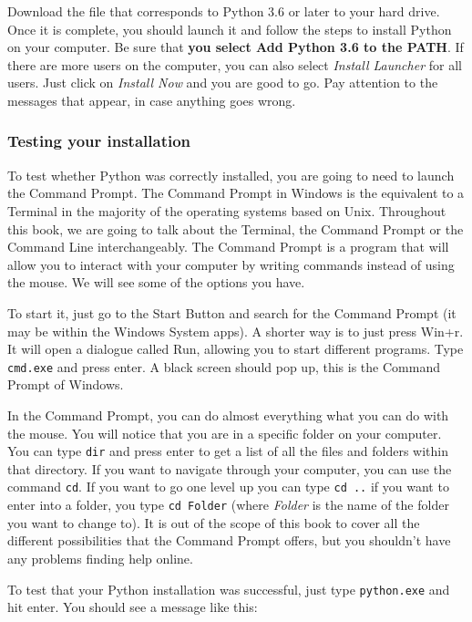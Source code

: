 Download the file that corresponds to Python 3.6 or later to your hard drive. Once it is complete, you should launch it and follow the steps to install Python on your computer. Be sure that \textbf{you select Add Python 3.6 to the PATH}. If there are more users on the computer, you can also select \emph{Install Launcher} for all users. Just click on \textit{Install Now} and you are good to go. Pay attention to the messages that appear, in case anything goes wrong.

\subsubsection{Testing your installation}
To test whether Python was correctly installed, you are going to need to launch the Command Prompt. The Command Prompt in Windows is the equivalent to a Terminal in the majority of the operating systems based on Unix. Throughout this book, we are going to talk about the Terminal, the Command Prompt or the Command Line interchangeably. The Command Prompt is a program that will allow you to interact with your computer by writing commands instead of using the mouse. We will see some of the options you have.

To start it, just go to the Start Button and search for the Command Prompt (it may be within the Windows System apps). A shorter way is to just press Win+r. It will open a dialogue called Run, allowing you to start different programs. Type \texttt{cmd.exe} and press enter. A black screen should pop up, this is the Command Prompt of Windows.

In the Command Prompt, you can do almost everything what you can do with the mouse. You will notice that you are in a specific folder on your computer. You can type \texttt{dir} and press enter to get a list of all the files and folders within that directory. If you want to navigate through your computer, you can use the command \texttt{cd}. If you want to go one level up you can type \texttt{cd ..} if you want to enter into a folder, you type \texttt{cd Folder} (where \textit{Folder} is the name of the folder you want to change to). It is out of the scope of this book to cover all the different possibilities that the Command Prompt offers, but you shouldn't have any problems finding help online.

To test that your Python installation was successful, just type \texttt{python.exe} and hit enter. You should see a message like this:

